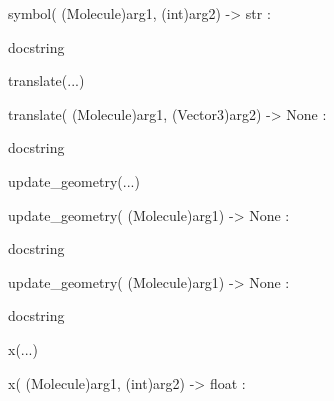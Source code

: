 \documentclass[letterpaper,10pt,english]{sphinxmanual}
\begin{document}
\begin{description}
\begin{description}
\begin{DUlineblock}{0em}
\item[]
\begin{DUlineblock}{\DUlineblockindent}
\item[] symbol( (Molecule)arg1, (int)arg2) -\textgreater{} str :
\item[]
\begin{DUlineblock}{\DUlineblockindent}
\item[] docstring
\item[] 
\end{DUlineblock}
\end{DUlineblock}
\item[] translate(...)
\item[]
\begin{DUlineblock}{\DUlineblockindent}
\item[] translate( (Molecule)arg1, (Vector3)arg2) -\textgreater{} None :
\item[]
\begin{DUlineblock}{\DUlineblockindent}
\item[] docstring
\item[] 
\end{DUlineblock}
\end{DUlineblock}
\item[] update\_geometry(...)
\item[]
\begin{DUlineblock}{\DUlineblockindent}
\item[] update\_geometry( (Molecule)arg1) -\textgreater{} None :
\item[]
\begin{DUlineblock}{\DUlineblockindent}
\item[] docstring
\item[] 
\end{DUlineblock}
\item[] update\_geometry( (Molecule)arg1) -\textgreater{} None :
\item[]
\begin{DUlineblock}{\DUlineblockindent}
\item[] docstring
\item[] 
\end{DUlineblock}
\end{DUlineblock}
\item[] x(...)
\item[]
\begin{DUlineblock}{\DUlineblockindent}
\item[] x( (Molecule)arg1, (int)arg2) -\textgreater{} float :
\item[]

\end{DUlineblock}
\end{DUlineblock}
\end{description}
\end{description}
\end{document}
